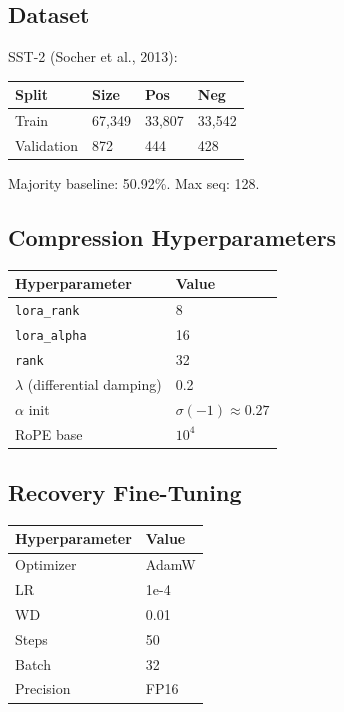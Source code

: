 \subsection{Dataset}

SST-2 (Socher et al., 2013):

\begin{table}[H]
\centering
\small
\begin{tabular}{llll}
\toprule
\textbf{Split} & \textbf{Size} & \textbf{Pos} & \textbf{Neg} \\
\midrule
Train & 67,349 & 33,807 & 33,542 \\
Validation & 872 & 444 & 428 \\
\bottomrule
\end{tabular}
\end{table}

Majority baseline: 50.92\%. Max seq: 128.

\subsection{Compression Hyperparameters}

\begin{table}[H]
\centering
\small
\begin{tabular}{ll}
\toprule
\textbf{Hyperparameter} & \textbf{Value} \\
\midrule
\texttt{lora\_rank} & 8 \\
\texttt{lora\_alpha} & 16 \\
\texttt{rank} & 32 \\
$\lambda$ (differential damping) & 0.2 \\
$\alpha$ init & $\sigma(-1) \approx 0.27$ \\
RoPE base & $10^4$ \\
\bottomrule
\end{tabular}
\end{table}

\subsection{Recovery Fine-Tuning}

\begin{table}[H]
\centering
\small
\begin{tabular}{ll}
\toprule
\textbf{Hyperparameter} & \textbf{Value} \\
\midrule
Optimizer & AdamW \\
LR & 1e-4 \\
WD & 0.01 \\
Steps & 50 \\
Batch & 32 \\
Precision & FP16 \\
\bottomrule
\end{tabular}
\end{table}

